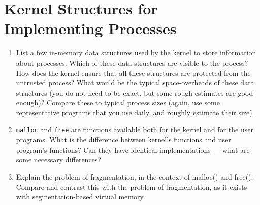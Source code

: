 \section{Kernel Structures for Implementing Processes}
\begin{enumerate}
\item List a few in-memory data structures used by the kernel
to store information about processes. Which of these data structures are
visible to the process? How does the kernel ensure that all these structures
are protected from the untrusted process? What would be the typical space-overheads
of these data structures (you do not need to be exact, but some rough
estimates are good enough)? Compare these to typical process sizes (again, use
some representative programs that you use daily, and roughly estimate their
size).

\item {\tt malloc} and {\tt free} are functions available both for the kernel
and for the user programs. What is the difference between kernel's functions
and user program's functions? Can they have identical implementations --- what
are some necessary differences?

\item Explain the problem of fragmentation, in the context of malloc() and
free(). Compare and contrast this with the problem of fragmentation, as
it exists with segmentation-based virtual memory.


\end{enumerate}
